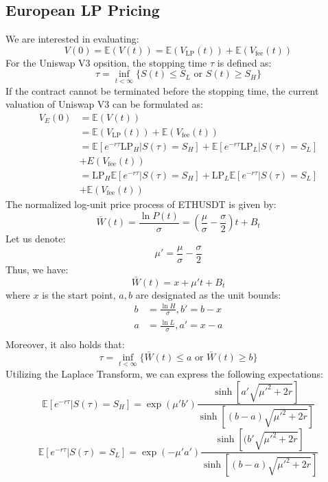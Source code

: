 \documentclass[conference]{IEEEtran}
\begin{document}
\subsection{European LP Pricing}\label{AA}
We are interested in evaluating:
$$
V(0) = \mathbb E(V(t)) = \mathbb E(V_{\text{LP}}(t))+\mathbb E(V_{\text{fee}}(t))
$$
For the Uniswap V3 opsition, the stopping time $\tau$ is defined as:
$$\tau = \inf\limits_{t<\infty}\{S(t)\leq S_L \text{ or }S(t)\geq S_H\}$$
If the contract cannot be terminated before the stopping time, the current valuation of Uniswap V3 can be formulated as:
$$
\begin{aligned}
V_{E}(0) &= \mathbb E(V(t))\\
&= \mathbb E(V_{\text{LP}}(t))+\mathbb E(V_{\text{fee}}(t))\\
&= \mathbb E[e^{-r\tau}\text{LP}_{ H}|S(\tau)=S_H]+ \mathbb E[e^{-r\tau}\text{LP}_{ L}|S(\tau)=S_L] \\& \mathbb +E(V_{\text{fee}}(t))\\
&= \text{LP}_{H} \mathbb E[e^{-r\tau}|S(\tau)=S_H]+\text{LP}_{L} \mathbb E[e^{-r\tau}|S(\tau)=S_L] \\
&+\mathbb E(V_{\text{fee}}(t))
\end{aligned}
$$
The normalized log-unit price process of ETHUSDT is given by:
$$
\bar W(t) = \frac{\ln P(t)}{\sigma}=(\frac{\mu}{\sigma}-\frac{\sigma}{2})t + B_t
$$
Let us denote:
$$
\mu' = \frac{\mu}{\sigma}-\frac{\sigma}{2}
$$
Thus, we have:
$$
\bar W(t) =x +\mu't +B_t
$$
where $x$ is the start point, $a,b$ are designated as the unit bounds:
$$
\begin{aligned}
b &= \frac{\ln H}{\sigma}, b' = b-x\\
a &= \frac{\ln L}{\sigma}, a' = x-a\\
\end{aligned}
$$
Moreover, it also holds that:
$$\tau = \inf\limits_{t<\infty}\{\bar W(t)\leq a \text{ or }\bar W(t)\geq b\}$$
Utilizing the Laplace Transform, we can express the following expectations:
$$
\mathbb E[e^{-r\tau}|S(\tau)=S_H] = \exp({\mu'b'})\frac{\sinh[a'\sqrt{\mu'^2+2r}]}{\sinh[(b-a)\sqrt{\mu'^2+2r}]}
$$
$$
\mathbb E[e^{-r\tau}|S(\tau)=S_L]=\exp({-\mu'a'})\frac{\sinh[(b'\sqrt{\mu'^2+2r}]}{\sinh[(b-a)\sqrt{\mu'^2+2r}]}
$$
\end{document}
